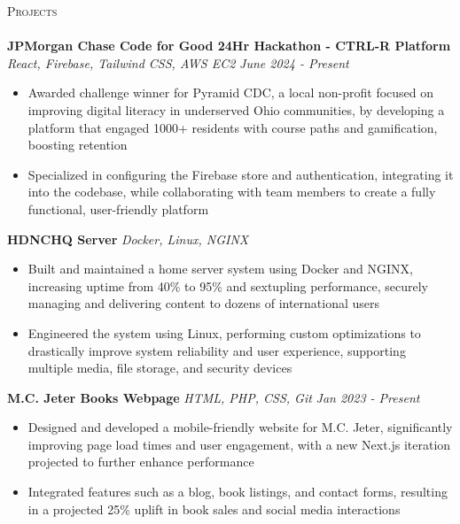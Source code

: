 \documentclass[letterpaper]{article}
\newcommand{\lineunder} {
    \vspace*{-8pt} \\
    \hspace*{-18pt} \hrulefill \\
}
\newcommand{\header} [1] {
    {\hspace*{-18pt}\vspace*{6pt} \textsc{#1}}
    \vspace*{-6pt} \lineunder
}
\begin{document}
\header{Projects}

    {\textbf{JPMorgan Chase Code for Good 24Hr Hackathon - CTRL-R Platform}} {\sl React, Firebase, Tailwind CSS, AWS EC2} \hfill \textsl{June 2024 - Present}\\
    \vspace{-2mm}
    \begin{itemize} \itemsep -1mm
    
        \item Awarded challenge winner for Pyramid CDC, a local non-profit focused on improving digital literacy in underserved Ohio communities, by developing a platform that engaged 1000+ residents with course paths and gamification, boosting retention

        \item Specialized in configuring the Firebase store and authentication, integrating it into the codebase, while collaborating with team members to create a fully functional, user-friendly platform

    \end{itemize}
    \vspace{-2mm}

    {\textbf{HDNCHQ Server}} {\sl Docker, Linux, NGINX} \\
    \vspace{-2mm}
    \begin{itemize} \itemsep -1mm

        \item Built and maintained a home server system using Docker and NGINX, increasing uptime from 40\% to 95\% and sextupling performance, securely managing and delivering content to dozens of international users
        
        \item Engineered the system using Linux, performing custom optimizations to drastically improve system reliability and user experience, supporting multiple media, file storage, and security devices
        
    \end{itemize}
    \vspace{-2mm}

    {\textbf{M.C. Jeter Books Webpage}} {\sl HTML, PHP, CSS, Git} \hfill \textsl{Jan 2023 - Present}\\
    \vspace{-2mm}
    \begin{itemize} \itemsep -1mm

        \item Designed and developed a mobile-friendly website for M.C. Jeter, significantly improving page load times and user engagement, with a new Next.js iteration projected to further enhance performance

        \item Integrated features such as a blog, book listings, and contact forms, resulting in a projected 25\% uplift in book sales and social media interactions
            
    \end{itemize}
    \vspace{-2mm}
\end{document}
